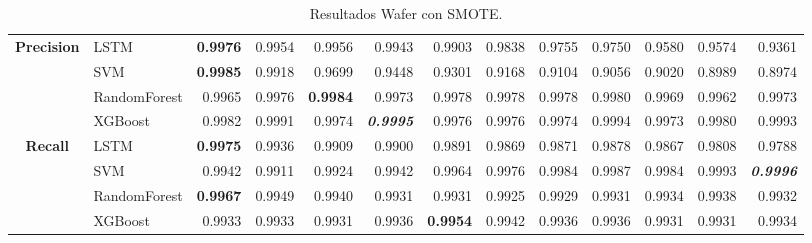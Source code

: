\begin{table}[H]
\begin{adjustbox}{max width=12cm}
\begin{tabular}{|c|l|r|r|r|r|r|r|r|r|r|r|r|}
			\hline
			\textbf{Precision} &  LSTM & \textbf{  0.9976 } &  0.9954 &  0.9956 &  0.9943 &  0.9903 &  0.9838 &  0.9755 &  0.9750 &  0.9580 &  0.9574 &  0.9361 \\
			&  SVM & \textbf{  0.9985 } &  0.9918 &  0.9699 &  0.9448 &  0.9301 &  0.9168 &  0.9104 &  0.9056 &  0.9020 &  0.8989 &  0.8974 \\
			&  RandomForest &  0.9965 &  0.9976 & \textbf{  0.9984 } &  0.9973 &  0.9978 &  0.9978 &  0.9978 &  0.9980 &  0.9969 &  0.9962 &  0.9973 \\
			&  XGBoost &  0.9982 &  0.9991 &  0.9974 & \textit{ \textbf{  0.9995 } } &  0.9976 &  0.9976 &  0.9974 &  0.9994 &  0.9973 &  0.9980 &  0.9993 \\
			\hline
			\textbf{Recall} &  LSTM & \textbf{  0.9975 } &  0.9936 &  0.9909 &  0.9900 &  0.9891 &  0.9869 &  0.9871 &  0.9878 &  0.9867 &  0.9808 &  0.9788 \\
			&  SVM &  0.9942 &  0.9911 &  0.9924 &  0.9942 &  0.9964 &  0.9976 &  0.9984 &  0.9987 &  0.9984 &  0.9993 & \textit{ \textbf{  0.9996 } } \\
			&  RandomForest & \textbf{  0.9967 } &  0.9949 &  0.9940 &  0.9931 &  0.9931 &  0.9925 &  0.9929 &  0.9931 &  0.9934 &  0.9938 &  0.9932 \\
			&  XGBoost &  0.9933 &  0.9933 &  0.9931 &  0.9936 & \textbf{  0.9954 } &  0.9942 &  0.9936 &  0.9936 &  0.9931 &  0.9931 &  0.9934 \\
			\hline
		\end{tabular}
	\end{adjustbox}
	\caption{Resultados Wafer con SMOTE.}
	\label{tab:Wafer_SMOTE}
\end{table}
